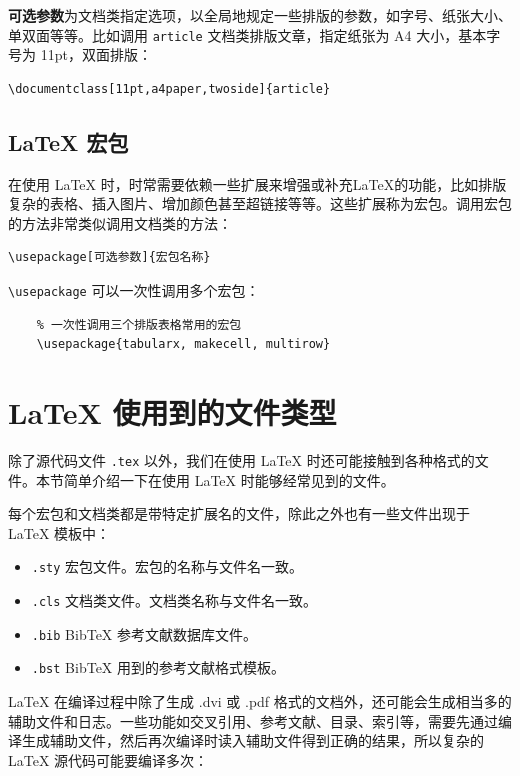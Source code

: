 {\bf 可选参数}为文档类指定选项，以全局地规定一些排版的参数，如字号、纸张大小、单双面等等。比如调用 \lstinline{article} 文档类排版文章，指定纸张为 A4 大小，基本字号为 11pt，双面排版：
\begin{lstlisting}
\documentclass[11pt,a4paper,twoside]{article}
\end{lstlisting}

\subsection{\LaTeX{} 宏包}\label{subsec:latexpackage}
在使用 \LaTeX{} 时，时常需要依赖一些扩展来增强或补充\LaTeX{}的功能，比如排版复杂的表格、插入图片、增加颜色甚至超链接等等。这些扩展称为宏包。调用宏包的方法非常类似调用文档类的方法：
\begin{lstlisting}
\usepackage[可选参数]{宏包名称}
\end{lstlisting}
\lstinline{\usepackage} 可以一次性调用多个宏包：

\begin{lstlisting}
    % 一次性调用三个排版表格常用的宏包
    \usepackage{tabularx, makecell, multirow}
\end{lstlisting}

\section{\LaTeX{} 使用到的文件类型}\label{sec:latexfiletypes}

除了源代码文件 \lstinline{.tex} 以外，我们在使用 \LaTeX{} 时还可能接触到各种格式的文件。本节简单介绍一下在使用 \LaTeX{} 时能够经常见到的文件。

每个宏包和文档类都是带特定扩展名的文件，除此之外也有一些文件出现于 \LaTeX{} 模板中：

\begin{itemize}
    \item \lstinline{.sty} 宏包文件。宏包的名称与文件名一致。
    \item \lstinline{.cls} 文档类文件。文档类名称与文件名一致。
    \item \lstinline{.bib} BibTeX 参考文献数据库文件。
    \item \lstinline{.bst} BibTeX 用到的参考文献格式模板。
\end{itemize}

\LaTeX{} 在编译过程中除了生成 .dvi 或 .pdf 格式的文档外，还可能会生成相当多的辅助文件和日志。一些功能如交叉引用、参考文献、目录、索引等，需要先通过编译生成辅助文件，然后再次编译时读入辅助文件得到正确的结果，所以复杂的 \LaTeX{} 源代码可能要编译多次：

